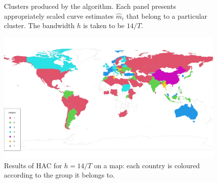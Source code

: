 \documentclass[a4paper,12pt]{article}
\numberwithin{equation}{section}
\begin{document}
\begin{figure}
\ContinuedFloat
\centering
\begin{subfigure}[b]{0.48\textwidth}
\end{subfigure}
\caption{Clusters produced by the algorithm. Each panel presents appropriately scaled curve estimates $\hat{m}_i$ that belong to a particular cluster. The bandwidth $h$ is taken to be $14/T$.}\label{fig:clusters}
\end{figure}

\begin{figure}[t!]
\begin{minipage}[t]{0.98\textwidth}
\includegraphics[width=\textwidth]{plots/14days/choropleth}
\caption{Results of HAC for $h = 14/T$ on a map: each country is coloured according to the group it belongs to.}\label{fig:map_14days}
\end{minipage}
\end{figure}



\clearpage

{\small
\setlength{\bibsep}{0.35em}
}
\end{document}
